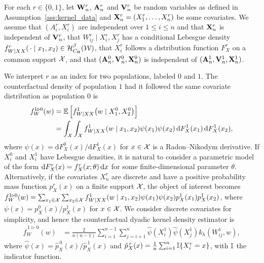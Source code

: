 For each $r \in \{0,1\}$, let $\mathbf{W}_n^r$, $\mathbf{A}_n^r$ and $\mathbf{V}_n^r$ be random
variables as defined in Assumption~\ref{ass:kernel_data} and
$\mathbf{X}_n^r = (X_1^r, \ldots, X_n^r)$ be some covariates.
We assume that $(A_i^r, X_i^r)$ are independent over $1 \leq i \leq n$
and that $\mathbf{X}_n^r$ is independent of $\mathbf{V}_n^r$, that
$W_{i j}^r \mid X_i^r, X_j^r$ has a conditional Lebesgue density
$f_{W \mid XX}^r(\,\cdot \mid x_1, x_2) \in \mathcal{H}^\beta_{C_{\mathrm{H}}}(\mathcal{W})$,
that $X_i^r$ follows a distribution function $F_X^r$ on a common support $\mathcal{X}$,
and that $(\mathbf{A}_n^0, \mathbf{V}_n^0, \mathbf{X}_n^0)$
is independent of $(\mathbf{A}_n^1, \mathbf{V}_n^1, \mathbf{X}_n^1)$.

We interpret $r$ as an index for two populations, labeled $0$ and $1$. The
counterfactual density of population $1$ had it followed the
same covariate distribution as population $0$ is
%
\begin{align*}
  f_W^{1 \triangleright 0}(w)
  &= \mathbb{E}\left[ f_{W \mid XX}^1\big(w \mid X_1^0, X_2^0\big) \right] \\
  &= \int_{\mathcal{X}} \int_{\mathcal{X}} f_{W \mid XX}^{1}(w \mid x_1, x_2)
  \psi(x_1) \psi(x_2) \,\mathrm{d}F_X^{1}(x_1) \,\mathrm{d}F_X^{1}(x_2),
\end{align*}
%
where $\psi(x) = \mathrm{d} F_X^0(x) / \mathrm{d} F_X^1(x)$ for $x \in \mathcal{X}$
is a Radon--Nikodym derivative. If $X^0_i$ and $X^1_i$ have Lebesgue densities,
it is natural to consider a parametric model of the form
$\mathrm{d} F_X^{r}(x)=f_X^r(x;\theta)\,\mathrm{d}x$
for some finite-dimensional parameter $\theta$.
Alternatively, if the covariates $X_n^r$ are discrete and have a positive
probability mass function $p_X^r(x)$ on a finite
support $\mathcal{X}$, the object of interest becomes
$f_W^{1 \triangleright 0}(w)
= \sum_{x_1 \in \mathcal{X}} \sum_{x_2 \in \mathcal{X}}
f_{W \mid XX}^{1}(w \mid x_1, x_2) \psi(x_1) \psi(x_2)
p_X^{1}(x_1) p_X^{1}(x_2)$,
where $\psi(x) = p_X^0(x)/p_X^1(x)$ for $x \in \mathcal{X}$.
We consider discrete covariates for simplicity,
and hence the counterfactual dyadic kernel density estimator is
%
\begin{align*}
  \hat f_W^{\,1 \triangleright 0}(w)
  &= \frac{2}{n(n-1)} \sum_{i=1}^{n-1} \sum_{j=i+1}^n
  \hat \psi(X_i^1) \hat \psi(X_j^1) k_h(W_{i j}^1, w),
\end{align*}
%
where $\hat\psi(x) = \hat p_X^{\,0}(x) / \hat p_X^{\,1}(x)$ and
$\hat p_X^{\,r}(x) = \frac{1}{n}\sum_{i = 1}^n \mathbb{I}\{X_i^r = x\}$,
with $\mathbb{I}$ the indicator function.


